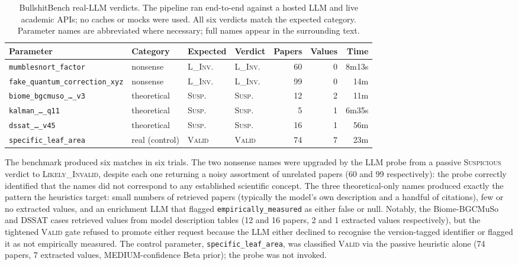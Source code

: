 \documentclass[11pt,a4paper]{article}
\begin{document}
\begin{table}[!htbp]
\centering
\small
\caption{BullshitBench real-LLM verdicts. The pipeline ran end-to-end against a hosted LLM and live academic APIs; no caches or mocks were used. All six verdicts match the expected category. Parameter names are abbreviated where necessary; full names appear in the surrounding text.}
\label{tab:bullshitbench}
\begin{tabular}{l l l l r r r}
\toprule
Parameter & Category & Expected & Verdict & Papers & Values & Time \\
\midrule
\texttt{mumblesnort\_factor} & nonsense & \textsc{L\_Inv.} & \textsc{L\_Inv.} & 60 & 0 & 8m13s \\
\texttt{fake\_quantum\_correction\_xyz} & nonsense & \textsc{L\_Inv.} & \textsc{L\_Inv.} & 99 & 0 & 14m \\
\texttt{biome\_bgcmuso\_\dots\_v3} & theoretical & \textsc{Susp.} & \textsc{Susp.} & 12 & 2 & 11m \\
\texttt{kalman\_\dots\_q11} & theoretical & \textsc{Susp.} & \textsc{Susp.} & 5 & 1 & 6m35s \\
\texttt{dssat\_\dots\_v45} & theoretical & \textsc{Susp.} & \textsc{Susp.} & 16 & 1 & 56m \\
\texttt{specific\_leaf\_area} & real (control) & \textsc{Valid} & \textsc{Valid} & 74 & 7 & 23m \\
\bottomrule
\end{tabular}
\end{table}

The benchmark produced six matches in six trials. The two nonsense names were upgraded by the LLM probe from a passive \textsc{Suspicious} verdict to \textsc{Likely\_Invalid}, despite each one returning a noisy assortment of unrelated papers (60 and 99 respectively): the probe correctly identified that the names did not correspond to any established scientific concept. The three theoretical-only names produced exactly the pattern the heuristics target: small numbers of retrieved papers (typically the model's own description and a handful of citations), few or no extracted values, and an enrichment LLM that flagged \texttt{empirically\_measured} as either false or null. Notably, the Biome-BGCMuSo and DSSAT cases retrieved values from model description tables (12 and 16 papers, 2 and 1 extracted values respectively), but the tightened \textsc{Valid} gate refused to promote either request because the LLM either declined to recognise the version-tagged identifier or flagged it as not empirically measured. The control parameter, \texttt{specific\_leaf\_area}, was classified \textsc{Valid} via the passive heuristic alone (74 papers, 7 extracted values, MEDIUM-confidence Beta prior); the probe was not invoked.
\end{document}
